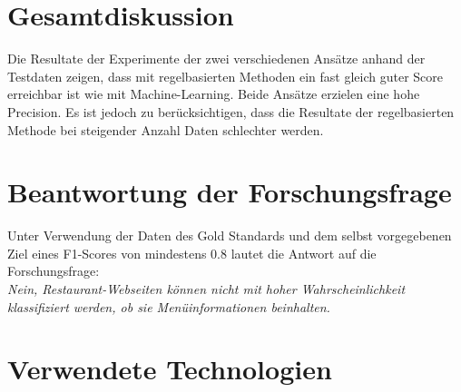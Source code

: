\section{Gesamtdiskussion}
Die Resultate der Experimente der zwei verschiedenen Ansätze anhand der Testdaten zeigen, dass mit regelbasierten Methoden ein fast gleich guter Score erreichbar ist wie mit Machine-Learning.
Beide Ansätze erzielen eine hohe Precision.
Es ist jedoch zu berücksichtigen, dass die Resultate der regelbasierten Methode bei steigender Anzahl Daten schlechter werden.

\section{Beantwortung der Forschungsfrage}
Unter Verwendung der Daten des Gold Standards und dem selbst vorgegebenen Ziel eines F1-Scores von mindestens 0.8 lautet die Antwort auf die Forschungsfrage:\\
\emph{Nein, Restaurant-Webseiten können nicht mit hoher Wahrscheinlichkeit klassifiziert werden, ob sie Menüinformationen beinhalten.}
\section{Verwendete Technologien}
